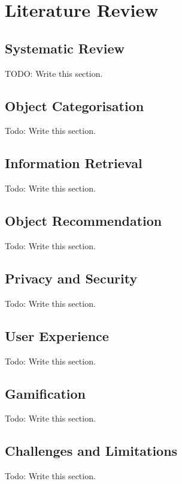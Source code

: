 \section{Literature Review}

\subsection{Systematic Review}

TODO: Write this section.

\subsection{Object Categorisation}

Todo: Write this section.

\subsection{Information Retrieval}

Todo: Write this section.

\subsection{Object Recommendation}

Todo: Write this section.

\subsection{Privacy and Security}

Todo: Write this section.

\subsection{User Experience}

Todo: Write this section.

\subsection{Gamification}

Todo: Write this section.

\subsection{Challenges and Limitations}

Todo: Write this section.

